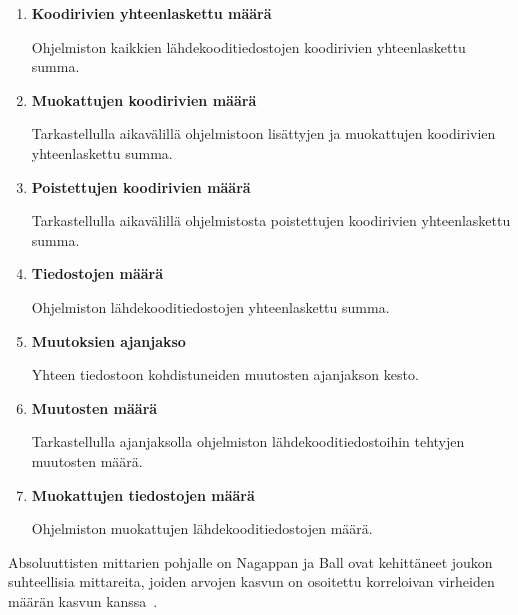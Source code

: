 \documentclass[finnish]{tktltiki2}
\theoremstyle{definition}
\theoremstyle{remark}
\begin{document}
\begin{enumerate}
    \item \textbf{Koodirivien yhteenlaskettu määrä}

        Ohjelmiston kaikkien lähdekooditiedostojen koodirivien yhteenlaskettu summa.
    \item \textbf{Muokattujen koodirivien määrä}

        Tarkastellulla aikavälillä ohjelmistoon lisättyjen ja muokattujen koodirivien yhteenlaskettu summa.
    \item \textbf{Poistettujen koodirivien määrä}

        Tarkastellulla aikavälillä ohjelmistosta poistettujen koodirivien yhteenlaskettu summa.
    \item \textbf{Tiedostojen määrä}

        Ohjelmiston lähdekooditiedostojen yhteenlaskettu summa.
    \item \textbf{Muutoksien ajanjakso}

        Yhteen tiedostoon kohdistuneiden muutosten ajanjakson kesto.
    \item \textbf{Muutosten määrä}

        Tarkastellulla ajanjaksolla ohjelmiston lähdekooditiedostoihin tehtyjen muutosten määrä.
    \item \textbf{Muokattujen tiedostojen määrä}

        Ohjelmiston muokattujen lähdekooditiedostojen määrä.
\end{enumerate}

Absoluuttisten mittarien pohjalle on Nagappan ja Ball ovat kehittäneet joukon suhteellisia mittareita, joiden arvojen kasvun on osoitettu korreloivan virheiden määrän kasvun kanssa~\cite{NB05}.
\end{document}
